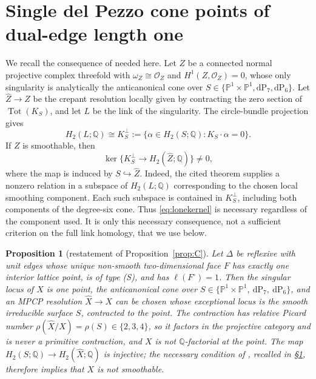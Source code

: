 \documentclass[11pt]{amsart}
\newtheorem{proposition}[theorem]{Proposition}
\theoremstyle{definition}
\theoremstyle{remark}
\newcommand{\PP}{\mathbb{P}}
\begin{document}
\section{Single del Pezzo cone points of dual-edge length one}
\label{sec:germ}

We recall the consequence of \cite[Thm.~A]{paper5} needed here.
Let $Z$ be a connected normal projective complex threefold with
$\omega_Z\cong\mathcal O_Z$ and $H^1(Z,\mathcal O_Z)=0$, whose only
singularity is analytically the anticanonical cone over
$S\in\{\PP^1\times\PP^1,\mathrm{dP}_7,\mathrm{dP}_6\}$.
Let $\widehat Z\to Z$ be the crepant resolution locally given by
contracting the zero section of $\operatorname{Tot}(K_S)$, and let
$L$ be the link of the singularity.  The circle-bundle projection gives
\[
 H_2(L;\mathbb Q)\cong K_S^\perp
 :=\{\alpha\in H_2(S;\mathbb Q):K_S\cdot\alpha=0\}.
\]
If $Z$ is smoothable, then
\begin{equation}\label{eq:lonekernel}
 \ker\bigl\{K_S^\perp\longrightarrow
                 H_2(\widehat Z;\mathbb Q)\bigr\}\ne0,
\end{equation}
where the map is induced by $S\hookrightarrow\widehat Z$.
Indeed, the cited theorem supplies a nonzero relation in a subspace of
$H_2(L;\mathbb Q)$ corresponding to the chosen local smoothing
component.  Each such subspace is contained in $K_S^\perp$, including
both components of the degree-six cone.  Thus \eqref{eq:lonekernel}
is necessary regardless of the component used.  It is only this
necessary consequence, not a sufficient criterion on the full link
homology, that we use below.

\begin{proposition}[restatement of
Proposition~\textup{\ref{prop:C}}]\label{prop:C2}
Let $\Delta$ be reflexive with unit edges whose unique non-smooth
two-dimensional face $F$ has exactly one interior lattice point, is of
type \textup{(S)}, and has $\ell(F^\circ) = 1$.  Then the singular locus
of $X$ is one point, the anticanonical cone over $S \in
\{\PP^1{\times}\PP^1,\ \mathrm{dP}_7,\ \mathrm{dP}_6\}$, and an MPCP
resolution $\widehat X \to X$ can be chosen whose exceptional locus is
the smooth irreducible surface $S$, contracted to the point.  The
contraction has relative Picard number
$\rho(\widehat X/X) = \rho(S) \in \{2,3,4\}$, so it factors in the projective category and
is \emph{never} a primitive contraction, and $X$ is not
$\mathbb{Q}$-factorial at the point.  The map
$H_2(S;\mathbb Q)\to H_2(\widehat X;\mathbb Q)$ is injective;
the necessary condition of \cite[Thm.~A]{paper5}, recalled in
\S\ref{sec:germ}, therefore implies that $X$ is not smoothable.
\end{proposition}
\end{document}
